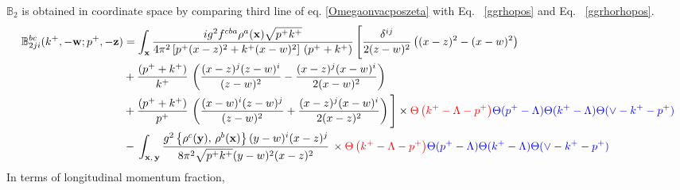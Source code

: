 \documentclass[10pt]{article}
\def\mf#1{\mathbb{#1}}
\def\v#1{\mathbf{#1}}
\numberwithin{equation}{section}
\begin{document}
$\mf{B}_{2}$ is obtained in coordinate space by comparing third line of eq. \eqref{Omegaonvacposzeta} with Eq.~ \eqref{ggrhopos} and Eq.~ \eqref{ggrhorhopos}.
\begin{align}
     \mf{B}^{bc}_{2ji}(k^{+}, -\v{w}; p^{+}, -\v{z}) & =    \int_{\mathbf{x}}\frac{ig^{2}f^{cba}\rho^{a}(\mathbf{x})\sqrt{p^{+}k^{+}}}{4\pi^{2}\left[p^{+}(x-z)^{2}+k^{+} (x-w)^{2}\right]\,(p^{+}+k^{+})}\,\Bigg[\frac{\delta^{ij}}{2(z-w)^{2}}\left((x-z)^{2}-(x-w)^{2}\right)\notag \\ & +\frac{(p^{+}+k^{+})}{k^{+}}\,\left(\frac{(x-z)^{j}(z-w)^{i}}{(z-w)^{2}}-\frac{(x-z)^{j}(x-w)^{i}}{2(x-w)^{2}}\right)\notag \\ & +\frac{(p^{+}+k^{+})}{p^{+}}\,\left(\frac{(x-w)^{i}(z-w)^{j}}{(z-w)^{2}} +\frac{(x-z)^{j}(x-w)^{i}}{2(x-z)^{2}}\right)\Bigg]\times \textcolor{red}{\Theta\left(k^{+}-\Lambda-p^{+}\right)}\textcolor{blue}{\Theta(p^{+}-\Lambda)\Theta(k^{+}-\Lambda)\Theta(\vee-k^{+}-p^{+})} \notag \\ & -\,\int_{\mathbf{x},\,\mathbf{y}}\frac{g^{2}\left\{ \rho^{c}(\mathbf{y}),\,\rho^{b}(\mathbf{x})\right\} (y-w)^{i}(x-z)^{j}}{8\pi^{2}\sqrt{p^{+}k^{+}}(y-w)^{2}(x-z)^{2}}\,\times \textcolor{red}{\Theta\left(k^{+}-\Lambda-p^{+}\right)}\textcolor{blue}{\Theta(p^{+}-\Lambda)\Theta(k^{+}-\Lambda)\Theta(\vee-k^{+}-p^{+})}
\end{align}
In terms of longitudinal momentum fraction,
\end{document}
